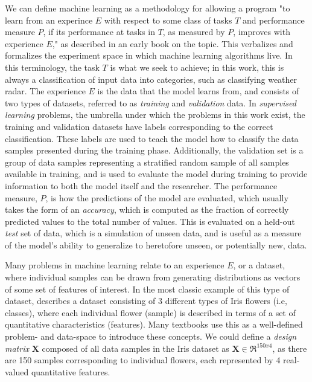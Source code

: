 We can define machine learning as a methodology for allowing a program "to learn from an experince $E$ with respect to some class of tasks $T$ and performance measure $P$, if its performance at tasks in $T$, as measured by $P$, improves with experience $E$," as described in an early book \cite{mitchell1997} on the topic. 
This verbalizes and formalizes the experiment space in which machine learning algorithms live.
In this terminology, the task $T$ is what we seek to achieve; in this work, this is always a classification of input data into categories, such as classifying weather radar. 
The experience $E$ is the data that the model learns from, and consists of two types of datasets, referred to as \textit{training} and \textit{validation} data. 
In \textit{supervised learning} problems, the umbrella under which the problems in this work exist, the training and validation datasets have labels corresponding to the correct classification.
These labels are used to teach the model how to classify the data samples presented during the training phase.
Additionally, the validation set is a group of data samples representing a stratified random sample of all samples available in training, and is used to evaluate the model during training to provide information to both the model itself and the researcher.
The performance measure, $P$, is how the predictions of the model are evaluated, which usually takes the form of an \textit{accuracy}, which is computed as the fraction of correctly predicted values to the total number of values.
This is evaluated on a held-out \textit{test} set of data, which is a simulation of unseen data, and is useful as a measure of the model's ability to generalize to heretofore unseen, or potentially new, data.

Many problems in machine learning relate to an experience $E$, or a dataset, where individual samples can be drawn from generating distributions as vectors of some set of features of interest.
In the most classic example of this type of dataset, \cite{fisher1936use} describes a dataset consisting of 3 different types of Iris flowers (i.e, classes), where each individual flower (sample) is described in terms of a set of quantitative characteristics (features).
Many textbooks use this as a well-defined problem- and data-space to introduce these concepts.
We could define a \textit{design matrix} $\textbf{X}$ composed of all data samples in the Iris dataset as $\textbf{X} \in \Re^{150x4}$, as there are 150 samples corresponding to individual flowers, each represented by 4 real-valued quantitative features.

